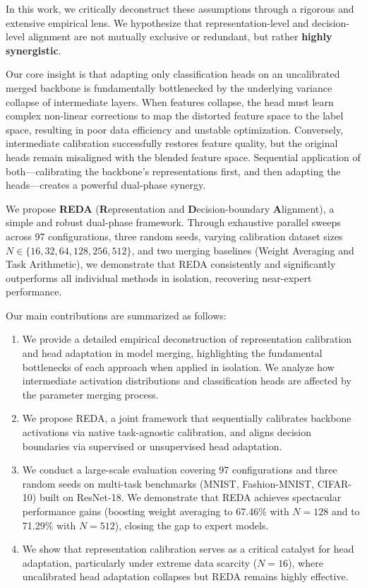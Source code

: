 \documentclass{article}
\theoremstyle{plain}
\theoremstyle{definition}
\theoremstyle{remark}
\begin{document}
In this work, we critically deconstruct these assumptions through a rigorous and extensive empirical lens. We hypothesize that representation-level and decision-level alignment are not mutually exclusive or redundant, but rather \textbf{highly synergistic}. 

Our core insight is that adapting only classification heads on an uncalibrated merged backbone is fundamentally bottlenecked by the underlying variance collapse of intermediate layers. When features collapse, the head must learn complex non-linear corrections to map the distorted feature space to the label space, resulting in poor data efficiency and unstable optimization. Conversely, intermediate calibration successfully restores feature quality, but the original heads remain misaligned with the blended feature space. Sequential application of both—calibrating the backbone's representations first, and then adapting the heads—creates a powerful dual-phase synergy.

We propose \textbf{REDA} (\textbf{R}epresentation and \textbf{D}ecision-boundary \textbf{A}lignment), a simple and robust dual-phase framework. Through exhaustive parallel sweeps across 97 configurations, three random seeds, varying calibration dataset sizes $N \in \{16, 32, 64, 128, 256, 512\}$, and two merging baselines (Weight Averaging and Task Arithmetic), we demonstrate that REDA consistently and significantly outperforms all individual methods in isolation, recovering near-expert performance.

Our main contributions are summarized as follows:
\begin{enumerate}
    \item We provide a detailed empirical deconstruction of representation calibration and head adaptation in model merging, highlighting the fundamental bottlenecks of each approach when applied in isolation. We analyze how intermediate activation distributions and classification heads are affected by the parameter merging process.
    \item We propose REDA, a joint framework that sequentially calibrates backbone activations via native task-agnostic calibration, and aligns decision boundaries via supervised or unsupervised head adaptation.
    \item We conduct a large-scale evaluation covering 97 configurations and three random seeds on multi-task benchmarks (MNIST, Fashion-MNIST, CIFAR-10) built on ResNet-18. We demonstrate that REDA achieves spectacular performance gains (boosting weight averaging to 67.46\% with $N=128$ and to 71.29\% with $N=512$), closing the gap to expert models.
    \item We show that representation calibration serves as a critical catalyst for head adaptation, particularly under extreme data scarcity ($N=16$), where uncalibrated head adaptation collapses but REDA remains highly effective.
\end{enumerate}
\end{document}
